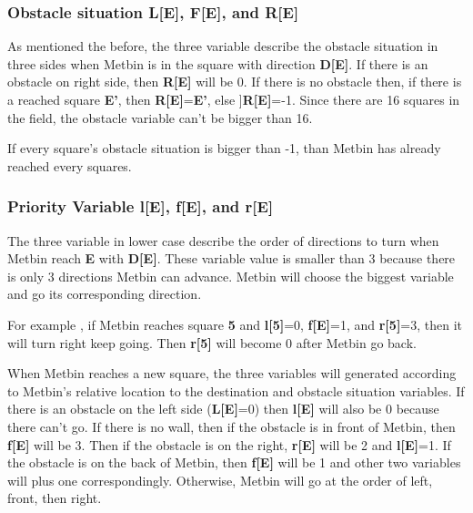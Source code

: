 \documentclass[12pt]{article}
\begin{document}
\subsubsection{Obstacle situation \textbf{L[E]}, \textbf{F[E]}, and \textbf{R[E]}}
As mentioned the before, the three variable describe the obstacle situation in three sides when Metbin is in the square with direction \textbf{D[E]}. If there is an obstacle on right side, then \textbf{R[E]} will be 0. If there is no obstacle then, if there is a reached square \textbf{E'}, then \textbf{R[E]}=\textbf{E'}, else ]\textbf{R[E]}=-1. Since there are 16 squares in the field, the obstacle variable can't be bigger than 16.  
\par If every square's obstacle situation is bigger than -1, than Metbin has already reached every squares.
\subsubsection{Priority Variable \textbf{l[E]}, \textbf{f[E]}, and \textbf{r[E]}}
The three variable in lower case describe the order of directions to turn when Metbin reach \textbf{E} with \textbf{D[E]}. These variable value is smaller than 3 because there is only 3 directions Metbin can advance. Metbin will choose the biggest variable and go its corresponding direction. 
\par For example , if Metbin reaches square \textbf{5} and \textbf{l[5]}=0, \textbf{f[E]}=1, and \textbf{r[5]}=3, then it will turn right keep going. Then \textbf{r[5]} will become 0 after Metbin go back.
\par When Metbin reaches a new square, the three variables will generated according to Metbin's relative location to the destination and obstacle situation variables. If there is an obstacle on the left side (\textbf{L[E]}=0) then \textbf{l[E]} will also be 0 because there can't go. If there is no wall, then if the obstacle is in front of Metbin, then \textbf{f[E]} will be 3. Then if the obstacle is on the right, \textbf{r[E]} will be 2 and \textbf{l[E]}=1. If the obstacle is on the back of Metbin, then \textbf{f[E]} will be 1 and other two variables will plus one correspondingly. Otherwise, Metbin will go at the order of left, front, then right.
\end{document}
